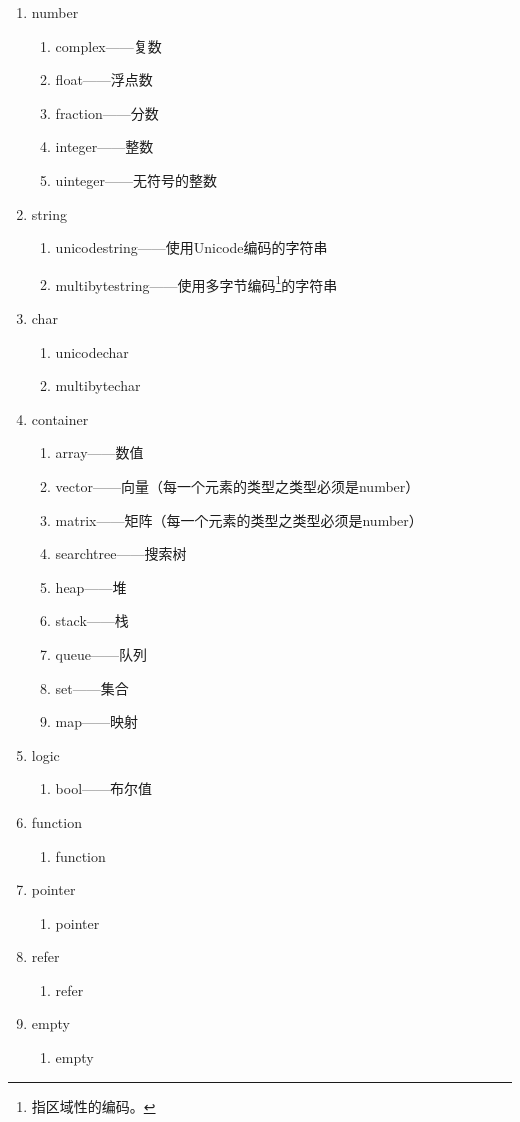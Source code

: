 \documentclass[11pt]{ctexrep}
\begin{document}
\begin{enumerate}
\item number
	\begin{enumerate}
	\item complex——复数
	\item float——浮点数
	\item fraction——分数
	\item integer——整数
	\item uinteger——无符号的整数
	\end{enumerate}
\item string
	\begin{enumerate}
	\item unicodestring——使用Unicode编码的字符串
	\item multibytestring——使用多字节编码\footnote{指区域性的编码。}的字符串
	\end{enumerate}
\item char
	\begin{enumerate}
	\item unicodechar
	\item multibytechar
	\end{enumerate}
\item container
	\begin{enumerate}
	\item array——数值
	\item vector——向量（每一个元素的类型之类型必须是number）
	\item matrix——矩阵（每一个元素的类型之类型必须是number）
	\item searchtree——搜索树
	\item heap——堆
	\item stack——栈
	\item queue——队列
	\item set——集合
	\item map——映射
	\end{enumerate}
\item logic
	\begin{enumerate}
	\item bool——布尔值
	\end{enumerate}
\item function
	\begin{enumerate}
	\item function
	\end{enumerate}
\item pointer
	\begin{enumerate}
	\item pointer
	\end{enumerate}
\item refer
	\begin{enumerate}
	\item refer
	\end{enumerate}
\item empty
	\begin{enumerate}
	\item empty
	\end{enumerate}
\end{enumerate}
\end{document}
